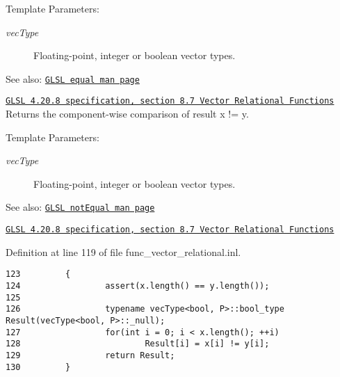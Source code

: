 \begin{Desc}
\item[Template Parameters:]
\begin{description}
\item[{\em vecType}]Floating-point, integer or boolean vector types.\end{description}
\end{Desc}
\begin{Desc}
\item[See also:]\href{http://www.opengl.org/sdk/docs/manglsl/xhtml/equal.xml}{\tt GLSL equal man page} 

\href{http://www.opengl.org/registry/doc/GLSLangSpec.4.20.8.pdf}{\tt GLSL 4.20.8 specification, section 8.7 Vector Relational Functions} Returns the component-wise comparison of result x != y.\end{Desc}
\begin{Desc}
\item[Template Parameters:]
\begin{description}
\item[{\em vecType}]Floating-point, integer or boolean vector types.\end{description}
\end{Desc}
\begin{Desc}
\item[See also:]\href{http://www.opengl.org/sdk/docs/manglsl/xhtml/notEqual.xml}{\tt GLSL notEqual man page} 

\href{http://www.opengl.org/registry/doc/GLSLangSpec.4.20.8.pdf}{\tt GLSL 4.20.8 specification, section 8.7 Vector Relational Functions} \end{Desc}


Definition at line 119 of file func\_\-vector\_\-relational.inl.

\begin{Code}\begin{verbatim}123         {
124                 assert(x.length() == y.length());
125 
126                 typename vecType<bool, P>::bool_type Result(vecType<bool, P>::_null);
127                 for(int i = 0; i < x.length(); ++i)
128                         Result[i] = x[i] != y[i];
129                 return Result;
130         }
\end{verbatim}
\end{Code}


